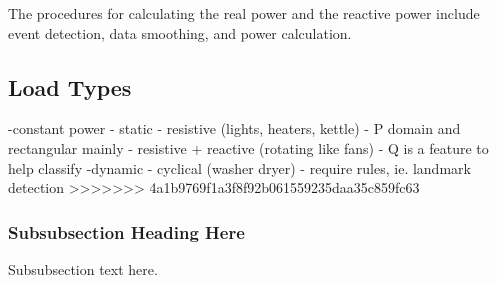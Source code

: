 \documentclass[conference]{IEEEtran}
\begin{document}
	
	
	The procedures for calculating the real power and the reactive power include event detection, data smoothing, and power calculation.
	
	\subsection{Load Types}
	-constant power - static 
	- resistive (lights, heaters, kettle) - P domain and rectangular mainly
	- resistive + reactive (rotating like fans) - Q is a feature to help classify
	-dynamic
	- cyclical (washer dryer) - require rules, ie. landmark detection
	>>>>>>> 4a1b9769f1a3f8f92b061559235daa35c859fc63
	
	\subsubsection{Subsubsection Heading Here}
	Subsubsection text here.
	
	
	
	
	
	
\end{document}
